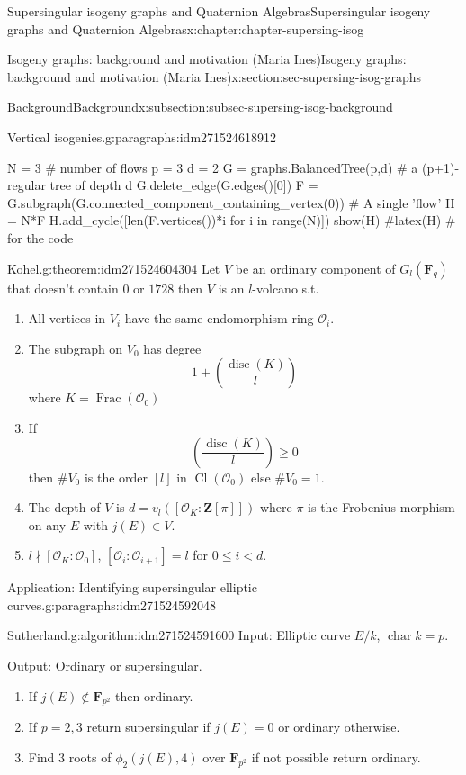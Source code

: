 \documentclass[oneside,10pt,]{book}
\numberwithin{equation}{section}
\newcommand{\lb}{[}
\newcommand{\rb}{]}
\newcommand{\ZZ}{\mathbf{Z}}
\newcommand{\FF}{\mathbf{F}}
\newcommand{\ints}{\mathcal{O}}
\DeclareMathOperator{\Cl}{Cl}
\DeclareMathOperator{\disc}{disc}
\DeclareMathOperator{\characteristic}{char}
\DeclareMathOperator{\Frac}{Frac}
\newcommand{\lt}{<}
\begin{document}
\begin{chapterptx}{Supersingular isogeny graphs and Quaternion Algebras}{}{Supersingular isogeny graphs and Quaternion Algebras}{}{}{x:chapter:chapter-supersing-isog}
\begin{sectionptx}{Isogeny graphs: background and motivation (Maria Ines)}{}{Isogeny graphs: background and motivation (Maria Ines)}{}{}{x:section:sec-supersing-isog-graphs}
\begin{subsectionptx}{Background}{}{Background}{}{}{x:subsection:subsec-supersing-isog-background}
\begin{paragraphs}{Vertical isogenies.}{g:paragraphs:idm271524618912}
\begin{sageinput}
N = 3 # number of flows
p = 3
d = 2
G = graphs.BalancedTree(p,d) # a (p+1)-regular tree of depth d
G.delete_edge(G.edges()[0])
F = G.subgraph(G.connected_component_containing_vertex(0)) # A single 'flow'
H = N*F
H.add_cycle([len(F.vertices())*i for i in range(N)])
show(H)
#latex(H) # for the code
\end{sageinput}
\begin{theorem}{Kohel.}{}{g:theorem:idm271524604304}%
Let \(V\) be an ordinary component of \(G_l(\FF_q)\) that doesn't contain \(0\) or \(1728\) then \(V\) is an \(l\)-volcano s.t.%
\begin{enumerate}
\item{}All vertices in \(V_i\) have the same endomorphism ring \(\ints_i\).%
\item{}The subgraph on \(V_0\) has degree%
\begin{equation*}
1+ \left(\frac {\disc(K)}{l}\right)
\end{equation*}
where \(K = \Frac(\ints_0)\)%
\item{}If%
\begin{equation*}
\left(\frac {\disc(K)}{l}\right) \ge 0
\end{equation*}
then \(\#V_0\) is the order \(\lb l \rb\) in \(\Cl (\ints_0)\) else \(\#V_0 = 1\).%
\item{}The depth of \(V\) is \(d = v_l (\lb \ints_K : \ZZ\lb\pi \rb\rb)\) where \(\pi\) is the Frobenius morphism on any \(E\) with \(j(E) \in V\).%
\item{}\(l \nmid \lb \ints_K : \ints_0 \rb\), \(\lb \ints_i : \ints_{i+1}\rb = l\) for \(0\le i \lt d\).%
\end{enumerate}
%
\end{theorem}
\end{paragraphs}%
\begin{paragraphs}{Application: Identifying supersingular elliptic curves.}{g:paragraphs:idm271524592048}%
\begin{algorithm}{Sutherland.}{}{g:algorithm:idm271524591600}%
Input: Elliptic curve \(E/k\), \(\characteristic k = p\).%
\par
Output: Ordinary or supersingular.%
\par
%
\begin{enumerate}
\item{}If \(j(E) \not \in \FF_{p^2}\) then ordinary.%
\item{}If \(p  =2,3\) return supersingular if \(j(E) = 0\) or ordinary otherwise.%
\item{}Find 3 roots of \(\phi_2(j(E), 4)\) over \(\FF_{p^2}\) if not possible return ordinary.%

\end{enumerate}
\end{algorithm}
\end{paragraphs}
\end{subsectionptx}
\end{sectionptx}
\end{chapterptx}
\end{document}
